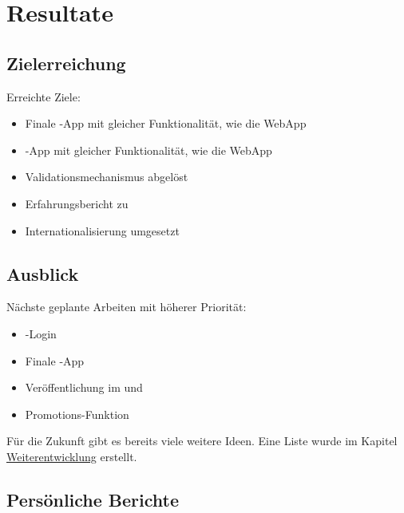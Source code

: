 \chapter{Resultate}
\label{tb-resultate}




\section{Zielerreichung}
Erreichte Ziele:

\begin{itemize}
	\item Finale -App mit gleicher Funktionalität, wie die \gls{WebApp}
	\item {}-App mit gleicher Funktionalität, wie die \gls{WebApp}
	\item Validationsmechanismus abgelöst
	\item Erfahrungsbericht zu 
	\item Internationalisierung umgesetzt
\end{itemize}

\section{Ausblick}
Nächste geplante Arbeiten mit höherer Priorität:

\begin{itemize}
	\item {}-Login
	\item Finale -App
	\item Veröffentlichung im  und  
	\item Promotions-Funktion
\end{itemize}

Für die Zukunft gibt es bereits viele weitere Ideen. 
Eine Liste wurde im Kapitel \hyperref[pd-resultate-weiterentwicklung]{Weiterentwicklung} erstellt.

\section{Persönliche Berichte}

